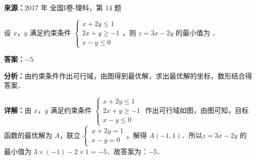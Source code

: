 \begin{question}[points=5]
\textbf{来源：}2017 年 全国I卷-理科，第 14 题\par
设 $x$，$y$ 满足约束条件 $\begin{cases} x+2y\leq 1 \\ 2x+y\geq -1 \\ x-y\leq 0 \end{cases}$，则 $z=3x-2y$ 的最小值为 ．
\fillin[{$-5$}]
\begin{solution}
\textbf{答案：}$-5$

\textbf{分析：}由约束条件作出可行域，由图得到最优解，求出最优解的坐标，数形结合得答案．

\textbf{详解：}由 $x$，$y$ 满足约束条件 $\begin{cases} x+2y\leq 1 \\ 2x+y\geq -1 \\ x-y\leq 0 \end{cases}$ 作出可行域如图，由图可知，目标函数的最优解为 $A$，联立 $\begin{cases} x+2y=1 \\ x-y=0 \end{cases}$，解得 $A(-1,1)$．所以$z=3x-2y$ 的最小值为 $3\times(-1)-2\times1=-5$．故答案为：$-5$．
\end{solution}
\end{question}

